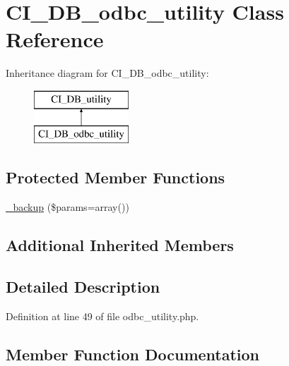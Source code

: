 \hypertarget{class_c_i___d_b__odbc__utility}{}\section{C\+I\+\_\+\+D\+B\+\_\+odbc\+\_\+utility Class Reference}
\label{class_c_i___d_b__odbc__utility}
Inheritance diagram for C\+I\+\_\+\+D\+B\+\_\+odbc\+\_\+utility\+:\begin{figure}[H]
\begin{center}
\leavevmode
\includegraphics[height=2.000000cm]{class_c_i___d_b__odbc__utility}
\end{center}
\end{figure}
\subsection*{Protected Member Functions}
\begin{DoxyCompactItemize}
\item 
\mbox{\hyperlink{class_c_i___d_b__odbc__utility_a30f3053d2c82e7562349924363507afa}{\+\_\+backup}} (\$params=array())
\end{DoxyCompactItemize}
\subsection*{Additional Inherited Members}


\subsection{Detailed Description}


Definition at line 49 of file odbc\+\_\+utility.\+php.



\subsection{Member Function Documentation}
\mbox{\label{class_c_i___d_b__odbc__utility_a30f3053d2c82e7562349924363507afa}} 
